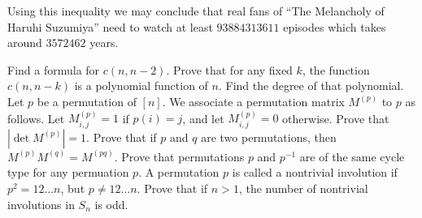 Using this inequality we may conclude that real fans of
``The Melancholy of Haruhi Suzumiya'' need to watch at least $93884313611$
episodes which takes around $3572462$ years.
\begin{chapterendexercises}
  \exercise Find a formula for $c(n, n - 2)$.
  \exercise Prove that for any fixed $k$, the function $c(n, n - k)$ is a
    polynomial function of $n$. Find the degree of that polynomial.
  \exercise Let $p$ be a permutation of $[n]$. We associate a permutation matrix
    $M^{(p)}$ to $p$ as follows. Let $M^{(p)}_{i, j} = 1$ if $p(i) = j$, and let
    $M^{(p)}_{i, j} = 0$ otherwise. Prove that $|\det M^{(p)}| = 1$.
  \exercise Prove that if $p$ and $q$ are two permutations, then
    $M^{(p)} M^{(q)} = M^{(pq)}$.
  \exercise Prove that permutations $p$ and $p^{-1}$ are of the same cycle type
    for any permuation $p$.
  \exercise A permutation $p$ is called a nontrivial involution if
    $p^2 = 1 2 \dots n$, but $p \neq 12 \dots n$. Prove that if $n > 1$, the
    number of nontrivial involutions in $S_n$ is odd.
\end{chapterendexercises}
